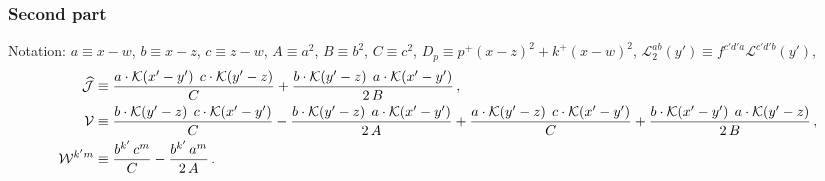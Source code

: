 \documentclass[9pt]{article}
\numberwithin{equation}{section}
\begin{document}
\subsubsection{Second part}
\noindent Notation: $a\equiv x-w$, $b\equiv x-z$, $c\equiv z-w$, $A\equiv a^{2}$, $B\equiv b^{2}$, $C\equiv c^{2}$, $D_{p}\equiv p^{+}(x-z)^{2}+k^{+}(x-w)^{2}$, $\mathcal{L}_{2}^{ab}(y')\equiv f^{c'd'a}\mathcal{L}^{c'd'b}(y')$,
\begin{align}
\widehat{\mathcal{J}} & \equiv\frac{a\cdot\mathcal{K}(x'-y')\;\,c\cdot\mathcal{K}(y'-z)}{C}+\frac{b\cdot\mathcal{K}(y'-z)\;\,a\cdot\mathcal{K}(x'-y')}{2\,B}\,,\notag\\
\mathcal{V} & \equiv\frac{b\cdot\mathcal{K}(y'-z)\;\,c\cdot\mathcal{K}(x'-y')}{C}-\frac{b\cdot\mathcal{K}(y'-z)\;\,a\cdot\mathcal{K}(x'-y')}{2\,A}+\frac{a\cdot\mathcal{K}(y'-z)\;\,c\cdot\mathcal{K}(x'-y')}{C}+\frac{b\cdot\mathcal{K}(x'-y')\;\,a\cdot\mathcal{K}(y'-z)}{2\,B}\,,\notag\\
\mathcal{W}^{k'm} & \equiv\frac{b^{k'}\,c^{m}}{C}-\frac{b^{k'}\,a^{m}}{2\,A}\,.\notag
\end{align}
\end{document}
